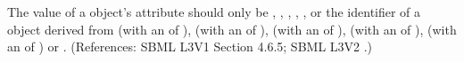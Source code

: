 The value of a \Species object's  attribute should
only be  , ,
, , ,  or the
identifier of a \UnitDefinition object derived from  (with an
 of ),  (with an  of
),  (with an  of ), 
(with an  of ),  (with an
 of ) or .  (References: SBML L3V1 Section 4.6.5; SBML
L3V2 .)
